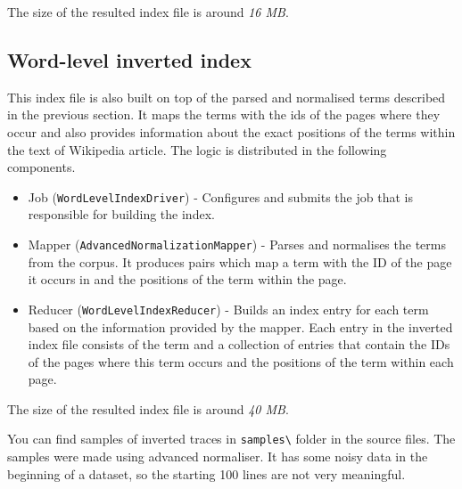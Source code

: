 \documentclass[a4paper, notitlepage]{report}
\begin{document}
The size of the resulted index file is around \emph{16 MB}.
\subsection{Word-level inverted index}
This index file is also built on top of the parsed and normalised terms described in the previous section. It maps the terms with the ids of the pages where they occur and also provides information about the exact positions of the terms within the text of Wikipedia article. The logic is distributed in the following components.

\begin{itemize}
	\item Job (\lstinline{WordLevelIndexDriver}) - Configures and submits the job that is responsible for building the index.
	\item Mapper (\lstinline{AdvancedNormalizationMapper}) - Parses and normalises the terms from the corpus. It produces pairs which map a term with the ID of the page it occurs in and the positions of the term within the page.
	\item Reducer (\lstinline{WordLevelIndexReducer}) - Builds an index entry for each term based on the information provided by the mapper. Each entry in the inverted index file consists of the term and a collection of entries that contain the IDs of the pages where this term occurs and the positions of the term within each page.  
\end{itemize}

The size of the resulted index file is around \emph{40 MB}.

You can find samples of inverted traces in \lstinline{samples\} folder in the source files. The samples were made using advanced normaliser. It has some noisy data in the beginning of a dataset, so the starting 100 lines are not very meaningful.
\end{document}
